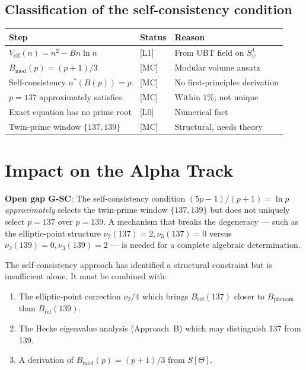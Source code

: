 \documentclass[12pt,a4paper]{article}
\theoremstyle{definition}
\theoremstyle{remark}
\newcommand{\Veff}{V_{\mathrm{eff}}}
\begin{document}
\subsection{Classification of the self-consistency condition}

\begin{center}
\begin{tabular}{lll}
  \toprule
  Step & Status & Reason \\
  \midrule
  $\Veff(n) = n^2 - Bn\ln n$ & [L1] & From UBT field on $S^1_\psi$ \\
  $B_{\mathrm{mod}}(p) = (p+1)/3$ & [MC] & Modular volume ansatz \\
  Self-consistency $n^*(B(p)) = p$ & [MC] & No first-principles derivation \\
  $p=137$ approximately satisfies & [MC] & Within $1\%$; not unique \\
  Exact equation has no prime root & [L0] & Numerical fact \\
  Twin-prime window $\{137,139\}$ & [MC] & Structural, needs theory \\
  \bottomrule
\end{tabular}
\end{center}

\section{Impact on the Alpha Track}
\label{sec:sc:impact}

\begin{gapbox}
\textbf{Open gap G-SC}: The self-consistency condition
$(5p-1)/(p+1) = \ln p$ \emph{approximately} selects the twin-prime window
$\{137, 139\}$ but does not uniquely select $p = 137$ over $p = 139$.
A mechanism that breaks the degeneracy — such as the elliptic-point
structure $\nu_2(137)=2, \nu_3(137)=0$ versus $\nu_2(139)=0, \nu_3(139)=2$
— is needed for a complete algebraic determination.
\end{gapbox}

The self-consistency approach has identified a structural constraint but is
insufficient alone.  It must be combined with:
\begin{enumerate}
  \item The elliptic-point correction $\nu_2/4$ which brings $B_{\mathrm{ref}}(137)$
        closer to $B_{\mathrm{phenom}}$ than $B_{\mathrm{ref}}(139)$.
  \item The Hecke eigenvalue analysis (Approach~B) which may distinguish 137 from 139.
  \item A derivation of $B_{\mathrm{mod}}(p) = (p+1)/3$ from $S[\Theta]$.
\end{enumerate}
\end{document}
